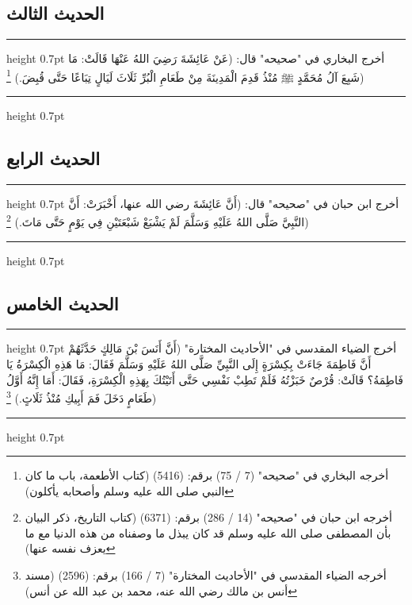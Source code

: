 \documentclass[12pt,openany]{book}
\newenvironment{hadithblock}
  {\par\medskip\noindent\begin{minipage}{\linewidth}\hrule height 0.7pt \vspace{0.6em}\small}
  {\vspace{0.4em}\hrule height 0.7pt\end{minipage}\par\medskip}
\begin{document}
\subsection*{الحديث الثالث}
\begin{hadithblock}
أخرج البخاري في "صحيحه" قال: (عَنْ عَائِشَةَ رَضِيَ اللهُ عَنْهَا قَالَتْ: مَا شَبِعَ آلُ مُحَمَّدٍ ﷺ مُنْذُ قَدِمَ الْمَدِينَةَ مِنْ طَعَامِ الْبُرِّ ثَلَاثَ لَيَالٍ تِبَاعًا حَتَّى قُبِضَ.) \footnote{أخرجه البخاري في "صحيحه" (7 / 75) برقم: (5416) (كتاب الأطعمة، باب ما كان النبي صلى الله عليه وسلم وأصحابه يأكلون)})
\end{hadithblock}

\subsection*{الحديث الرابع}
\begin{hadithblock}
أخرج ابن حبان في "صحيحه" قال: (أَنَّ عَائِشَةَ رضي الله عنها، أَخْبَرَتْ: أَنَّ النَّبِيَّ صَلَّى اللهُ عَلَيْهِ وَسَلَّمَ لَمْ يَشْبَعْ شَبْعَتَيْنِ فِي يَوْمٍ حَتَّى مَاتَ.) \footnote{أخرجه ابن حبان في "صحيحه" (14 / 286) برقم: (6371) (كتاب التاريخ، ذكر البيان بأن المصطفى صلى الله عليه وسلم قد كان يبذل ما وصفناه من هذه الدنيا مع ما يعزف نفسه عنها)})
\end{hadithblock}

\subsection*{الحديث الخامس}
\begin{hadithblock}
أخرج الضياء المقدسي في "الأحاديث المختارة" (أَنَّ أَنَسَ بْنَ مَالِكٍ حَدَّثَهُمْ أَنَّ فَاطِمَةَ جَاءَتْ بِكِسْرَةٍ إِلَى النَّبِيِّ صَلَّى اللهُ عَلَيْهِ وَسَلَّمَ فَقَالَ: مَا هَذِهِ الْكِسْرَةُ يَا فَاطِمَةُ؟ قَالَتْ: قُرْصٌ خَبَزْتُهُ فَلَمْ تَطِبْ نَفْسِي حَتَّى أَتَيْتُكَ بِهَذِهِ الْكِسْرَةِ، فَقَالَ: أَمَا إِنَّهُ أَوَّلُ طَعَامٍ دَخَلَ فَمَ أَبِيكِ مُنْذُ ثَلَاثٍ.) \footnote{أخرجه الضياء المقدسي في "الأحاديث المختارة" (7 / 166) برقم: (2596) (مسند أنس بن مالك رضي الله عنه، محمد بن عبد الله عن أنس)})
\end{hadithblock}
\end{document}
